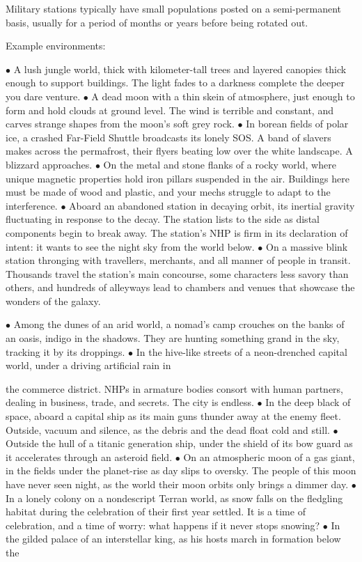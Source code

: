 Military stations typically have small populations posted on a semi-permanent basis, usually for a
period of months or years before being rotated out.


Example environments:


    $\bullet$    A lush jungle world, thick with kilometer-tall trees and layered canopies thick enough to
        support buildings. The light fades to a darkness complete the deeper you dare venture.
    $\bullet$    A dead moon with a thin skein of atmosphere, just enough to form and hold clouds at
        ground level. The wind is terrible and constant, and carves strange shapes from the
        moon’s soft grey rock.
    $\bullet$    In borean fields of polar ice, a crashed Far-Field Shuttle broadcasts its lonely SOS. A band
        of slavers makes across the permafrost, their flyers beating low over the white landscape.
        A blizzard approaches.
    $\bullet$    On the metal and stone flanks of a rocky world, where unique magnetic properties hold
        iron pillars suspended in the air. Buildings here must be made of wood and plastic, and
        your mechs struggle to adapt to the interference.
    $\bullet$    Aboard an abandoned station in decaying orbit, its inertial gravity fluctuating in response
        to the decay. The station lists to the side as distal components begin to break away. The
        station’s NHP is firm in its declaration of intent: it wants to see the night sky from the
        world below.
    $\bullet$    On a massive blink station thronging with travellers, merchants, and all manner of people
        in transit. Thousands travel the station’s main concourse, some characters less savory
        than others, and hundreds of alleyways lead to chambers and venues that showcase the
        wonders of the galaxy.




$\bullet$    Among the dunes of an arid world, a nomad’s camp crouches on the banks of an oasis,
    indigo in the shadows. They are hunting something grand in the sky, tracking it by its
    droppings.
$\bullet$    In the hive-like streets of a neon-drenched capital world, under a driving artificial rain in

    the commerce district. NHPs in armature bodies consort with human partners, dealing in
    business, trade, and secrets. The city is endless.
$\bullet$    In the deep black of space, aboard a capital ship as its main guns thunder away at the
    enemy fleet. Outside, vacuum and silence, as the debris and the dead float cold and still.
$\bullet$    Outside the hull of a titanic generation ship, under the shield of its bow guard as it
    accelerates through an asteroid field.
$\bullet$    On an atmospheric moon of a gas giant, in the fields under the planet-rise as day slips to
    oversky. The people of this moon have never seen night, as the world their moon orbits
    only brings a dimmer day.
$\bullet$    In a lonely colony on a nondescript Terran world, as snow falls on the fledgling habitat
    during the celebration of their first year settled. It is a time of celebration, and a time of
    worry: what happens if it never stops snowing?
$\bullet$    In the gilded palace of an interstellar king, as his hosts march in formation below the

